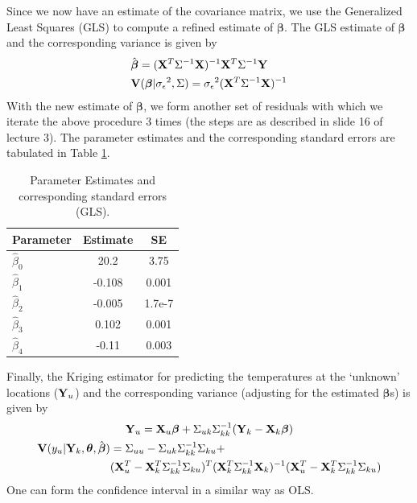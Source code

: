 \documentclass[a4paper,10pt]{article}
\def\bY{{\bf Y}}
\def\bX{{\bf X}}
\def\bV{{\bf V}}
\def\bbeta{{\boldsymbol \beta}}
\def\btheta{{\boldsymbol \theta}}
\def\sigmaeps{{\sigma_{\epsilon}}}
\begin{document}
Since we now have an estimate of the covariance matrix, we use the Generalized Least Squares (GLS) to compute a refined estimate of $\bbeta$. The GLS estimate of $\bbeta$ and the corresponding variance is given by
\begin{align*}
& \hat \bbeta = (\bX^T \Sigma^{-1} \bX)^{-1} \bX^T \Sigma^{-1} \bY \\
& \bV(\bbeta | \sigmaeps^2, \Sigma) = \sigmaeps^2 (\bX^T \Sigma^{-1} \bX)^{-1}
\end{align*}
With the new estimate of $\bbeta$, we form another set of residuals with which we iterate the above procedure 3 times (the steps are as described in slide 16 of lecture 3). The parameter estimates and the corresponding standard errors are tabulated in Table \ref{tab:glsest}.
\begin{table}[ht]
\centering
\begin{tabular}{lcc}
\hline
{\bf Parameter} & {\bf Estimate} & {\bf SE }\\
\hline
$\hat \beta_0$ & 20.2 & 3.75 \\
$\hat \beta_1$ & -0.108 & 0.001\\
$\hat \beta_2$ & -0.005 & 1.7e-7 \\
$\hat \beta_3$ & 0.102 & 0.001\\
$\hat \beta_4$ & -0.11 & 0.003\\
\hline
\end{tabular}
\caption{Parameter Estimates and corresponding standard errors (GLS).}
\label{tab:glsest}
\end{table}

Finally, the Kriging estimator for predicting the temperatures at the `unknown' locations ($\bY_u$) and the corresponding variance (adjusting for the estimated $\bbeta$s) is given by
\begin{gather*}
\bY_u = \bX_u \bbeta + \Sigma_{uk} \Sigma_{kk}^{-1} (\bY_k - \bX_k \bbeta) \\
\begin{split}
\bV(y_u| \bY_k, \btheta, \hat \bbeta) &= \Sigma_{uu} -  \Sigma_{uk} \Sigma_{kk}^{-1}\Sigma_{ku} + \\
&(\bX_u^T - \bX_k^T \Sigma_{kk}^{-1}\Sigma_{ku})^T ( \bX_k^T \Sigma_{kk}^{-1} \bX_k)^{-1} (\bX_u^T - \bX_k^T \Sigma_{kk}^{-1}\Sigma_{ku})
\end{split}
\end{gather*}
One can form the confidence interval in a similar way as OLS. 
\end{document}
